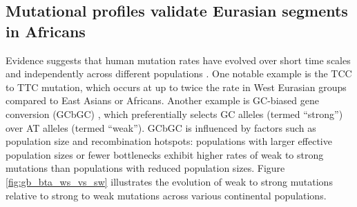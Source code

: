 \clearpage

\subsection{Mutational profiles validate Eurasian segments in Africans}
\label{sec:ch3-gb-bta-mutational}

Evidence suggests that human mutation rates have evolved over short time scales and independently across different populations \cite{harris2015evidence, harris2017rapid}. One notable example is the TCC to TTC mutation, which occurs at up to twice the rate in West Eurasian groups compared to East Asians or Africans. Another example is GC-biased gene conversion (GCbGC) \cite{duret2009biased}, which preferentially selects GC alleles (termed ``strong'') over AT alleles (termed ``weak''). GCbGC is influenced by factors such as population size and recombination hotspots: populations with larger effective population sizes or fewer bottlenecks exhibit higher rates of weak to strong mutations than populations with reduced population sizes. Figure \ref{fig:gb_bta_ws_vs_sw} illustrates the evolution of weak to strong mutations relative to strong to weak mutations across various continental populations.

